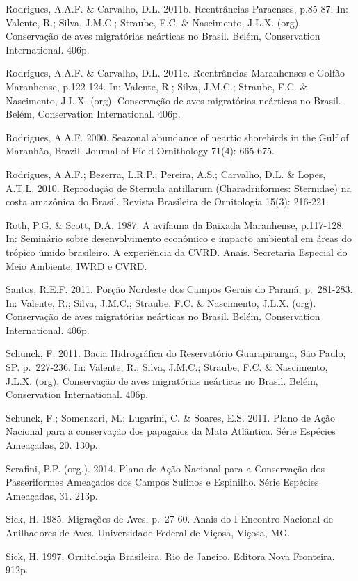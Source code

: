 \documentclass[
]{scrbook}
\begin{document}
Rodrigues, A.A.F. \& Carvalho, D.L. 2011b. Reentrâncias Paraenses, p.85-87. In: Valente, R.; Silva, J.M.C.; Straube, F.C. \& Nascimento, J.L.X. (org). Conservação de aves migratórias neárticas no Brasil. Belém, Conservation International. 406p.

Rodrigues, A.A.F. \& Carvalho, D.L. 2011c. Reentrâncias Maranhenses e Golfão Maranhense, p.122-124. In: Valente, R.; Silva, J.M.C.; Straube, F.C. \& Nascimento, J.L.X. (org). Conservação de aves migratórias neárticas no Brasil. Belém, Conservation International. 406p.

Rodrigues, A.A.F. 2000. Seazonal abundance of neartic shorebirds in the Gulf of Maranhão, Brazil. Journal of Field Ornithology 71(4): 665-675.

Rodrigues, A.A.F.; Bezerra, L.R.P.; Pereira, A.S.; Carvalho, D.L. \& Lopes, A.T.L. 2010. Reprodução de Sternula antillarum (Charadriiformes: Sternidae) na costa amazônica do Brasil. Revista Brasileira de Ornitologia 15(3): 216-221.

Roth, P.G. \& Scott, D.A. 1987. A avifauna da Baixada Maranhense, p.117-128. In: Seminário sobre desenvolvimento econômico e impacto ambiental em áreas do trópico úmido brasileiro. A experiência da CVRD. Anais. Secretaria Especial do Meio Ambiente, IWRD e CVRD.

Santos, R.E.F. 2011. Porção Nordeste dos Campos Gerais do Paraná, p.~281-283. In: Valente, R.; Silva, J.M.C.; Straube, F.C. \& Nascimento, J.L.X. (org). Conservação de aves migratórias neárticas no Brasil. Belém, Conservation International. 406p.

Schunck, F. 2011. Bacia Hidrográfica do Reservatório Guarapiranga, São Paulo, SP. p.~227-236. In: Valente, R.; Silva, J.M.C.; Straube, F.C. \& Nascimento, J.L.X. (org). Conservação de aves migratórias neárticas no Brasil. Belém, Conservation International. 406p.

Schunck, F.; Somenzari, M.; Lugarini, C. \& Soares, E.S. 2011. Plano de Ação Nacional para a conservação dos papagaios da Mata Atlântica. Série Espécies Ameaçadas, 20. 130p.

Serafini, P.P. (org.). 2014. Plano de Ação Nacional para a Conservação dos Passeriformes Ameaçados dos Campos Sulinos e Espinilho. Série Espécies Ameaçadas, 31. 213p.

Sick, H. 1985. Migrações de Aves, p.~27-60. Anais do I Encontro Nacional de Anilhadores de Aves. Universidade Federal de Viçosa, Viçosa, MG.

Sick, H. 1997. Ornitologia Brasileira. Rio de Janeiro, Editora Nova Fronteira. 912p.
\end{document}

